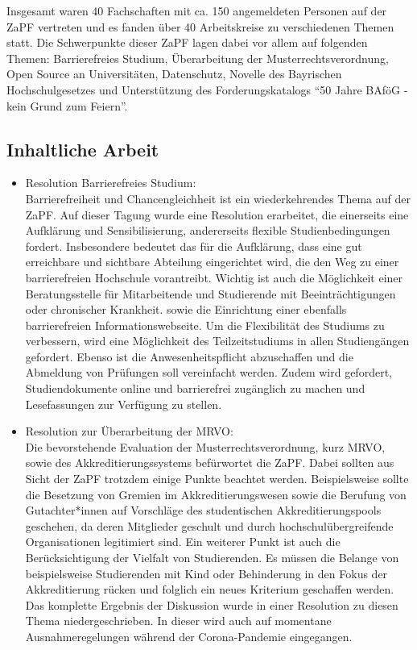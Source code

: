 \documentclass{scrartcl}
\begin{document}
Insgesamt waren 40 Fachschaften mit ca. 150 angemeldeten Personen auf der ZaPF vertreten und es fanden über 40 Arbeitskreise zu verschiedenen Themen statt. Die Schwerpunkte dieser ZaPF lagen dabei vor allem auf folgenden Themen:
Barrierefreies Studium, Überarbeitung der Musterrechtsverordnung, Open Source an Universitäten, Datenschutz, Novelle des Bayrischen Hochschulgesetzes und Unterstützung des Forderungskatalogs “50 Jahre BAföG - kein Grund zum Feiern”.

\subsection*{Inhaltliche Arbeit}

	\begin{itemize}
		\item Resolution Barrierefreies Studium:\\
Barrierefreiheit und Chancengleichheit ist ein wiederkehrendes Thema auf der ZaPF. Auf dieser Tagung wurde eine Resolution erarbeitet, die einerseits eine Aufklärung und Sensibilisierung, andererseits flexible Studienbedingungen fordert. Insbesondere bedeutet das für die Aufklärung, dass eine gut erreichbare und sichtbare Abteilung eingerichtet wird, die den Weg zu einer barrierefreien Hochschule vorantreibt. Wichtig ist auch die Möglichkeit einer Beratungsstelle für Mitarbeitende und Studierende mit
Beeinträchtigungen oder chronischer Krankheit. sowie die Einrichtung einer ebenfalls barrierefreien Informationswebseite. Um die Flexibilität des Studiums zu verbessern, wird eine Möglichkeit des Teilzeitstudiums in allen Studiengängen gefordert. Ebenso ist die Anwesenheitspflicht abzuschaffen und die Abmeldung von Prüfungen soll vereinfacht werden. Zudem wird gefordert, Studiendokumente online und barrierefrei zugänglich zu machen und Lesefassungen zur Verfügung zu stellen.

		\item Resolution zur Überarbeitung der MRVO:\\
Die bevorstehende Evaluation der Musterrechtsverordnung, kurz MRVO, sowie des Akkreditierungssystems befürwortet die ZaPF. Dabei sollten aus Sicht der ZaPF trotzdem einige Punkte beachtet werden. Beispielsweise sollte die Besetzung von Gremien im Akkreditierungswesen sowie die Berufung von Gutachter*innen auf Vorschläge des studentischen Akkreditierungspools geschehen, da deren Mitglieder geschult und durch hochschulübergreifende Organisationen legitimiert sind. Ein weiterer Punkt ist auch die Berücksichtigung der Vielfalt von Studierenden. Es müssen die Belange von beispielsweise Studierenden mit Kind oder Behinderung in den Fokus der Akkreditierung rücken und folglich ein neues Kriterium geschaffen werden. Das komplette Ergebnis der Diskussion wurde in einer Resolution zu diesen Thema niedergeschrieben. In dieser wird auch auf momentane Ausnahmeregelungen während der Corona-Pandemie eingegangen.


\end{itemize}
\end{document}

